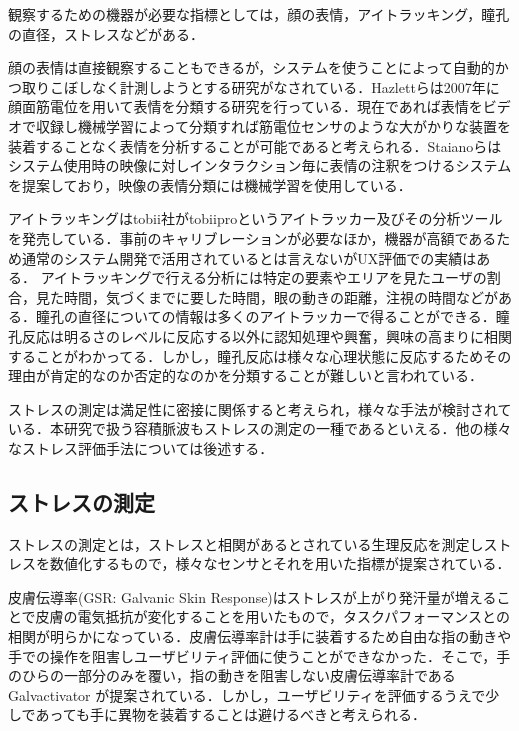 観察するための機器が必要な指標としては，顔の表情，アイトラッキング，瞳孔の直径，ストレス\cite{tullis2014}などがある．

顔の表情は直接観察することもできるが，システムを使うことによって自動的かつ取りこぼしなく計測しようとする研究がなされている．Hazlettらは2007年に顔面筋電位を用いて表情を分類する研究を行っている\cite{faceemg}．現在であれば表情をビデオで収録し機械学習によって分類すれば筋電位センサのような大がかりな装置を装着することなく表情を分析することが可能であると考えられる．Staianoらはシステム使用時の映像に対しインタラクション毎に表情の注釈をつけるシステムを提案しており，映像の表情分類には機械学習を使用している\cite{uxmate}．

アイトラッキングはtobii社がtobiipro\cite{tobii}というアイトラッカー及びその分析ツールを発売している．事前のキャリブレーションが必要なほか，機器が高額であるため通常のシステム開発で活用されているとは言えないがUX評価での実績はある．
アイトラッキングで行える分析には特定の要素やエリアを見たユーザの割合，見た時間，気づくまでに要した時間，眼の動きの距離，注視の時間などがある\cite{tullis2014}．瞳孔の直径についての情報は多くのアイトラッカーで得ることができる．瞳孔反応は明るさのレベルに反応する以外に認知処理や興奮，興味の高まりに相関することがわかってる．しかし，瞳孔反応は様々な心理状態に反応するためその理由が肯定的なのか否定的なのかを分類することが難しいと言われている\cite{tullis2014}．

ストレスの測定は満足性に密接に関係すると考えられ，様々な手法が検討されている．本研究で扱う容積脈波もストレスの測定の一種であるといえる．他の様々なストレス評価手法については後述する．

\subsection{ストレスの測定}

ストレスの測定とは，ストレスと相関があるとされている生理反応を測定しストレスを数値化するもので，様々なセンサとそれを用いた指標が提案されている．

皮膚伝導率(GSR: Galvanic Skin Response)はストレスが上がり発汗量が増えることで皮膚の電気抵抗が変化することを用いたもので，タスクパフォーマンスとの相関が明らかになっている\cite{lin2005}．皮膚伝導率計は手に装着するため自由な指の動きや手での操作を阻害しユーザビリティ評価に使うことができなかった．そこで，手のひらの一部分のみを覆い，指の動きを阻害しない皮膚伝導率計であるGalvactivator\cite{galvactivator} が提案されている．しかし，ユーザビリティを評価するうえで少しであっても手に異物を装着することは避けるべきと考えられる．

